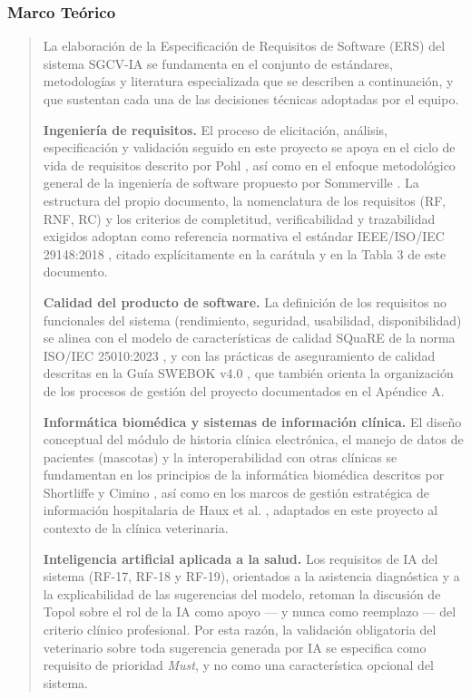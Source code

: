 \subsubsection{Marco Teórico}\label{marco-tuxe9orico}

\begin{quote}
La elaboración de la Especificación de Requisitos de Software (ERS)
del sistema SGCV-IA se fundamenta en el conjunto de estándares,
metodologías y literatura especializada que se describen a
continuación, y que sustentan cada una de las decisiones técnicas
adoptadas por el equipo.

\textbf{Ingeniería de requisitos.} El proceso de elicitación,
análisis, especificación y validación seguido en este proyecto se
apoya en el ciclo de vida de requisitos descrito por Pohl \cite{pohl2010},
así como en el enfoque metodológico general de la ingeniería de
software propuesto por Sommerville \cite{sommerville2016}. La estructura del
propio documento, la nomenclatura de los requisitos (RF, RNF, RC) y
los criterios de completitud, verificabilidad y trazabilidad exigidos
adoptan como referencia normativa el estándar IEEE/ISO/IEC
29148:2018 \cite{ieee291482018}, citado explícitamente en la carátula y en la
Tabla 3 de este documento.

\textbf{Calidad del producto de software.} La definición de los
requisitos no funcionales del sistema (rendimiento, seguridad,
usabilidad, disponibilidad) se alinea con el modelo de características
de calidad SQuaRE de la norma ISO/IEC 25010:2023 \cite{iso250102023}, y con
las prácticas de aseguramiento de calidad descritas en la Guía
SWEBOK v4.0 \cite{swebok2024}, que también orienta la organización de los
procesos de gestión del proyecto documentados en el Apéndice A.

\textbf{Informática biomédica y sistemas de información clínica.} El
diseño conceptual del módulo de historia clínica electrónica, el
manejo de datos de pacientes (mascotas) y la interoperabilidad con
otras clínicas se fundamentan en los principios de la informática
biomédica descritos por Shortliffe y Cimino \cite{shortliffe2014}, así como en
los marcos de gestión estratégica de información hospitalaria de
Haux et al. \cite{haux2018}, adaptados en este proyecto al contexto de la
clínica veterinaria.

\textbf{Inteligencia artificial aplicada a la salud.} Los requisitos
de IA del sistema (RF-17, RF-18 y RF-19), orientados a la asistencia
diagnóstica y a la explicabilidad de las sugerencias del modelo,
retoman la discusión de Topol \cite{topol2019} sobre el rol de la IA como
apoyo --- y nunca como reemplazo --- del criterio clínico profesional.
Por esta razón, la validación obligatoria del veterinario sobre toda
sugerencia generada por IA se especifica como requisito de prioridad
\emph{Must}, y no como una característica opcional del sistema.
\end{quote}

